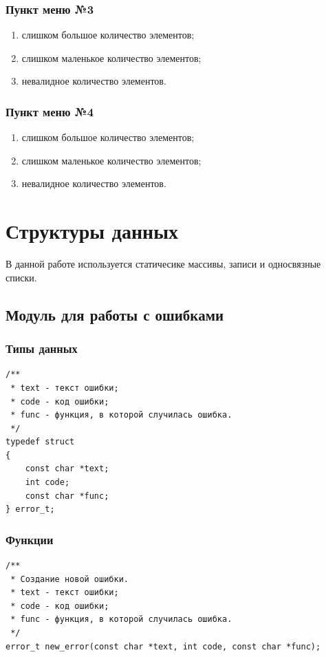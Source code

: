 \documentclass[a4paper,12pt]{extarticle}
\begin{document}
\subsubsection{Пункт меню №3}
\begin{enumerate}
    \item слишком большое количество элементов;
    \item слишком маленькое количество элементов;
    \item невалидное количество элементов.
\end{enumerate}

\subsubsection{Пункт меню №4}
\begin{enumerate}
    \item слишком большое количество элементов;
    \item слишком маленькое количество элементов;
    \item невалидное количество элементов.
\end{enumerate}

\newpage

\section{Структуры данных}
В данной работе используется статичесике массивы, записи и односвязные списки.

\subsection{Модуль для работы с ошибками}
\subsubsection{Типы данных}
\begin{verbatim}
/**
 * text - текст ошибки;
 * code - код ошибки;
 * func - функция, в которой случилась ошибка.
 */
typedef struct 
{
    const char *text;
    int code;
    const char *func;
} error_t;
\end{verbatim}


\subsubsection{Функции}
\begin{verbatim}
/**
 * Создание новой ошибки.
 * text - текст ошибки;
 * code - код ошибки;
 * func - функция, в которой случилась ошибка.
 */
error_t new_error(const char *text, int code, const char *func);
\end{verbatim}
\end{document}
